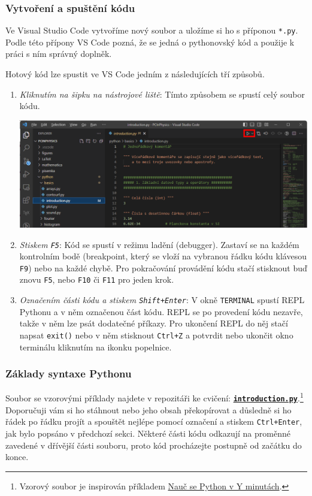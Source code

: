 \documentclass[a4paper,11pt,twoside]{article}
\def\code#1{\textnormal{\texttt{#1}}}
\def\ghfile#1#2{\textnormal{\textbf{\texttt{\href{https://github.com/PavelStransky/PCInPhysics/blob/main/#1#2}{#2}}}}}
\def\abbreviation#1{\textnormal{\textsc{#1}}}
\theoremstyle{red}
\theoremstyle{green}
\begin{document}
\subsubsection{Vytvoření a spuštění kódu}
    Ve Visual Studio Code vytvoříme nový soubor a uložíme si ho s příponou \code{*.py}. 
    Podle této přípony VS Code pozná, že se jedná o pythonovský kód a použije k práci s ním správný doplněk.
       
    Hotový kód lze spustit ve VS Code jedním z následujících tří způsobů.
    \begin{enumerate}
        \item 
            \emph{Kliknutím na šipku na nástrojové liště}:
            Tímto způsobem se spustí celý soubor kódu.
            \begin{center}\includegraphics[width=\linewidth]{PythonRun.png}\end{center}
        \item
            \emph{Stiskem \code{F5}}: Kód se spustí v režimu ladění (debugger).
            Zastaví se na každém kontrolním bodě (breakpoint, který se vloží na vybranou řádku kódu klávesou \code{F9}) nebo na každé chybě.
            Pro pokračování provádění kódu stačí stisknout buď znovu \code{F5}, nebo \code{F10} či \code{F11} pro jeden krok.

        \item
            \emph{Označením části kódu a stiskem \code{Shift+Enter}}: V okně \code{TERMINAL} spustí \abbreviation{REPL} Pythonu a v něm označenou část kódu.
            \abbreviation{REPL} se po provedení kódu nezavře, takže v něm lze psát dodatečné příkazy.
            Pro ukončení \abbreviation{REPL} do něj stačí napsat \code{exit()} nebo v něm stisknout \code{Ctrl+Z} a potvrdit nebo ukončit okno terminálu kliknutím na ikonku popelnice.
    \end{enumerate}

\subsubsection{Základy syntaxe Pythonu}
    Soubor se vzorovými příklady najdete v repozitáři ke cvičení: \ghfile{python/basics/}{introduction.py}.\footnote{
        Vzorový soubor je inspirován příkladem \href{https://learnxinyminutes.com/docs/cs-cz/python/}{Nauč se Python v Y minutách}.
    }
    Doporučuji vám si ho stáhnout nebo jeho obsah překopírovat a důsledně si ho řádek po řádku projít a spouštět nejlépe pomocí označení a stiskem \code{Ctrl+Enter}, jak bylo popsáno v předchozí sekci.
    Některé části kódu odkazují na proměnné zavedené v dřívější části souboru, proto kód procházejte postupně od začátku do konce.
\end{document}
